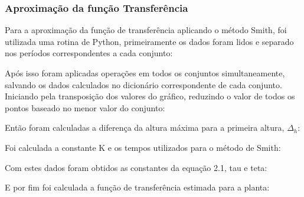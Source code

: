\subsubsection{Aproximação da função Transferência}
\hspace{11mm}Para a aproximação da função de transferência aplicando o método Smith, foi utilizada uma rotina de Python, primeiramente os dados foram lidos e separado nos períodos correspondentes a cada conjunto:



Após isso foram aplicadas operações em todos os conjuntos simultaneamente, salvando os dados calculados no dicionário correspondente de cada conjunto. Iniciando pela transposição dos valores do gráfico, reduzindo o valor de todos os pontos baseado no menor valor do conjunto:


Então foram calculadas a diferença da altura máxima para a primeira altura, $\Delta_h$:


    
Foi calculada a constante K e os tempos utilizados para o método de Smith:





Com estes dados foram obtidos as constantes da equação 2.1, tau e teta:




E por fim foi calculada a função de transferência estimada para a planta:



